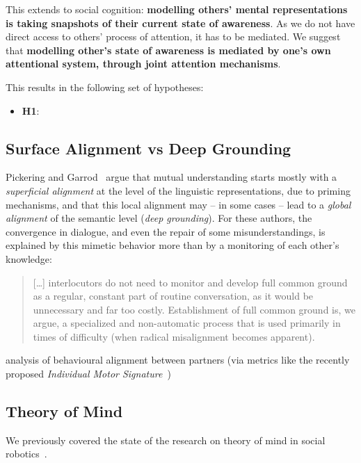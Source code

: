 \documentclass[a4paper]{article}
\begin{document}
This extends to social cognition: \textbf{modelling others' mental representations is
taking snapshots of their current state of awareness}. As we do not have direct
access to others' process of attention, it has to be mediated. We suggest that
\textbf{modelling other's state of awareness is mediated by one's own
attentional system, through joint attention mechanisms}.

This results in the following set of hypotheses:

\begin{itemize}
    \item \textbf{H1}: 
\end{itemize}


\subsection{Surface Alignment vs Deep Grounding}

Pickering and Garrod~\cite{pickering2006alignment} argue that mutual understanding
starts mostly with a \emph{superficial alignment} at the level of the linguistic
representations, due to priming mechanisms, and that this local alignment may --
in some cases -- lead to a \emph{global alignment} of the semantic level
(\emph{deep grounding}).  For these authors, the convergence in dialogue, and
even the repair of some misunderstandings, is explained by this mimetic behavior
more than by a monitoring of each other's knowledge:

\begin{quote}
[\ldots] interlocutors do
not need to monitor and develop full common ground as a regular, constant
part of routine conversation, as it would be unnecessary and far too costly.
Establishment of full common ground is, we argue, a specialized and
non-automatic process that is used primarily in times of difficulty (when
radical misalignment becomes apparent).~\citep[p.179]{pickering2006alignment}
\end{quote}


analysis of behavioural alignment between partners (via
metrics like the recently proposed \emph{Individual Motor
Signature}~\cite{slowinski2016dynamic})

\subsection{Theory of Mind}

We previously covered the state of the research on theory of mind in social
robotics~\cite{lemaignan2015mutual}.
\end{document}

